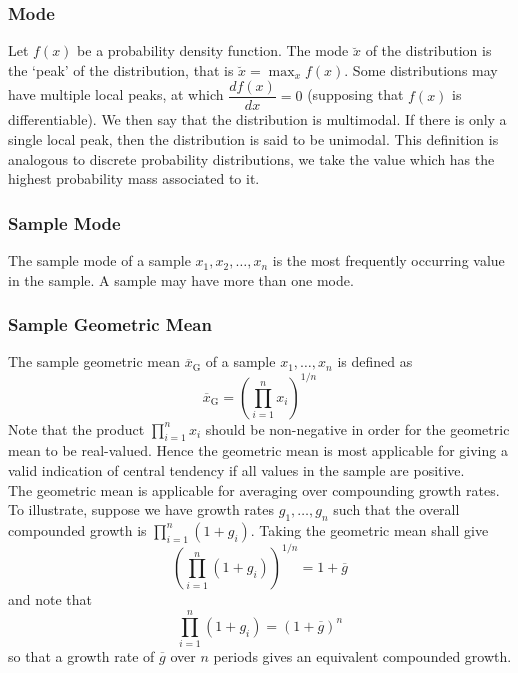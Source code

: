 \documentclass[11pt]{report} %
\begin{document}
\subsubsection{Mode}

Let $f\left(x\right)$ be a probability density function. The mode $\breve{x}$ of the distribution is the `peak' of the distribution, that is $\breve{x} = \max_{x}f\left(x\right)$. Some distributions may have multiple local peaks, at which $\dfrac{df\left(x\right)}{dx} = 0$ (supposing that $f\left(x\right)$ is differentiable). We then say that the distribution is multimodal. If there is only a single local peak, then the distribution is said to be unimodal. This definition is analogous to discrete probability distributions, we take the value which has the highest probability mass associated to it.

\subsubsection{Sample Mode}

The sample mode of a sample $x_{1}, x_{2}, \dots, x_{n}$ is the most frequently occurring value in the sample. A sample may have more than one mode.

\subsubsection{Sample Geometric Mean}

The sample geometric mean $\overline{x}_{\mathrm{G}}$ of a sample $x_{1}, \dots, x_{n}$ is defined as
\begin{equation}
\overline{x}_{\mathrm{G}} = \left(\prod_{i = 1}^{n}x_{i}\right)^{1/n}
\end{equation}
Note that the product $\prod_{i = 1}^{n}x_{i}$ should be non-negative in order for the geometric mean to be real-valued. Hence the geometric mean is most applicable for giving a valid indication of central tendency if all values in the sample are positive. \\

The geometric mean is applicable for averaging over compounding growth rates. To illustrate, suppose we have growth rates $g_{1}, \dots, g_{n}$ such that the overall compounded growth is $\prod_{i = 1}^{n}\left(1 + g_{i}\right)$. Taking the geometric mean shall give
\begin{equation}
\left(\prod_{i = 1}^{n}\left(1 + g_{i}\right)\right)^{1/n} = 1 + \overline{g}
\end{equation}
and note that
\begin{equation}
\prod_{i = 1}^{n}\left(1 + g_{i}\right) = \left(1 + \overline{g}\right)^{n}
\end{equation}
so that a growth rate of $\overline{g}$ over $n$ periods gives an equivalent compounded growth. \\
\end{document}
